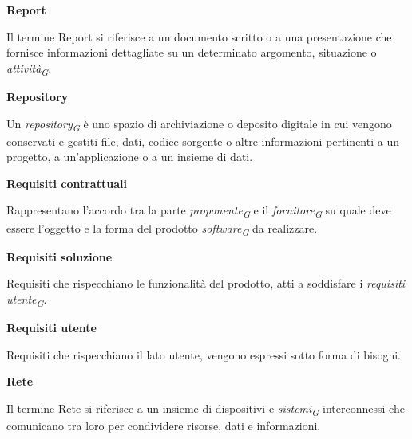 \documentclass{article}
\begin{document}
\textbf{Report}

\vspace{0.1cm}

Il termine Report si riferisce a un documento scritto o a una presentazione che fornisce informazioni dettagliate su un determinato argomento, situazione o \textit{attività}\textsubscript{\textit{G}}.

\vspace{0.4cm}

\textbf{Repository}

\vspace{0.1cm}

Un \textit{repository}\textsubscript{\textit{G}} è uno spazio di archiviazione o deposito digitale in cui vengono conservati e gestiti file, dati, codice sorgente o altre informazioni pertinenti a un progetto, a un'applicazione o a un insieme di dati.

\vspace{0.4cm}

\textbf{Requisiti contrattuali}

\vspace{0.1cm}

Rappresentano l’accordo tra la parte \textit{proponente}\textsubscript{\textit{G}} e il \textit{fornitore}\textsubscript{\textit{G}} su quale deve essere l’oggetto e la forma del prodotto \textit{software}\textsubscript{\textit{G}} da realizzare.

\vspace{0.4cm}

\textbf{Requisiti soluzione}

\vspace{0.1cm}

Requisiti che rispecchiano le funzionalità del prodotto, atti a soddisfare i \textit{requisiti utente}\textsubscript{\textit{G}}.

\vspace{0.4cm}

\textbf{Requisiti utente}

\vspace{0.1cm}

Requisiti che rispecchiano il lato utente, vengono espressi sotto forma di bisogni.

\vspace{0.4cm}

\textbf{Rete}

\vspace{0.1cm}

Il termine Rete si riferisce a un insieme di dispositivi e \textit{sistemi}\textsubscript{\textit{G}} interconnessi che comunicano tra loro per condividere risorse, dati e informazioni.
\end{document}
